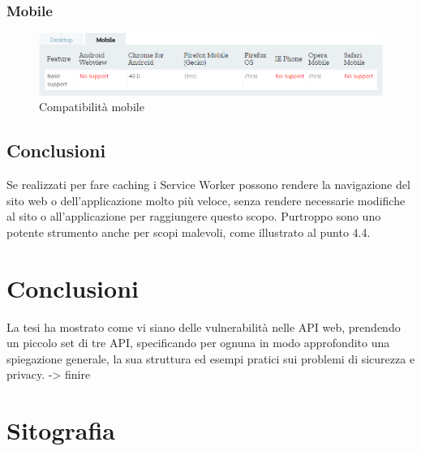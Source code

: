 \documentclass[11pt ,a4paper , twoside , openright ]{article}
\begin{document}
\subsubsection{Mobile}
\begin{figure}[h]
	\centering
	\includegraphics[width=1\linewidth]{CompMobile}
	\caption{Compatibilità mobile}
	\label{fig:Compatibilità mobile}
\end{figure}
\subsection{Conclusioni}
Se realizzati per fare caching i Service Worker possono rendere la navigazione del sito web o dell'applicazione molto più veloce, senza rendere necessarie modifiche al sito o all'applicazione per raggiungere questo scopo. 
Purtroppo sono uno potente strumento anche per scopi malevoli, come illustrato al punto 4.4.
\newpage
\cleardoublepage
\section{Conclusioni}
La tesi ha mostrato come vi siano delle vulnerabilità nelle API web, prendendo un piccolo set di tre API, specificando per ognuna in modo approfondito una spiegazione generale, la sua struttura ed esempi pratici sui problemi di sicurezza e privacy.
-> finire 

\cleardoublepage
\listoffigures
\cleardoublepage
\section{Sitografia}	
\end{document}

